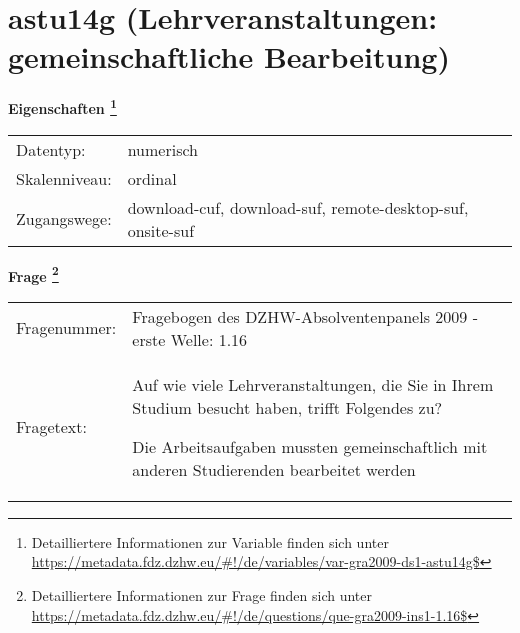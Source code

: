 
    \setcounter{footnote}{0}

    \vspace*{-1.8cm}
	\section{astu14g (Lehrveranstaltungen: gemeinschaftliche Bearbeitung)}
	\label{section:astu14g}



    \vspace*{0.5cm}
    \noindent\textbf{Eigenschaften
	\footnote{Detailliertere Informationen zur Variable finden sich unter
		\url{https://metadata.fdz.dzhw.eu/\#!/de/variables/var-gra2009-ds1-astu14g$}}}\\
	\begin{tabularx}{\hsize}{@{}lX}
	Datentyp: & numerisch \\
	Skalenniveau: & ordinal \\
	Zugangswege: &
	  download-cuf, 
	  download-suf, 
	  remote-desktop-suf, 
	  onsite-suf
 \\
    \end{tabularx}



				\vspace*{0.5cm}
                \noindent\textbf{Frage
	                \footnote{Detailliertere Informationen zur Frage finden sich unter
		              \url{https://metadata.fdz.dzhw.eu/\#!/de/questions/que-gra2009-ins1-1.16$}}}\\
				\begin{tabularx}{\hsize}{@{}lX}
					Fragenummer: &
					  Fragebogen des DZHW-Absolventenpanels 2009 - erste Welle:
					  1.16
 \\
					Fragetext: & Auf wie viele Lehrveranstaltungen, die Sie in Ihrem Studium besucht haben, trifft Folgendes zu?\par  Die Arbeitsaufgaben mussten gemeinschaftlich mit anderen Studierenden bearbeitet werden \\
				\end{tabularx}





